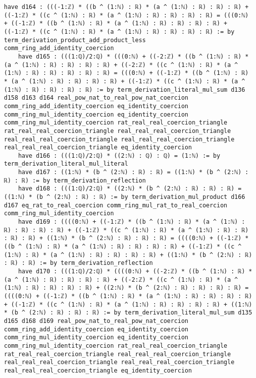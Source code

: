 \documentclass{article}
\begin{document}
\begin{tcolorbox}[colback=white!10, width=\linewidth]
\begin{lstlisting}[language=Lean4]
    have d164 : (((-1:ℤ) * ((b ^ (1:ℕ) : ℝ) * (a ^ (1:ℕ) : ℝ) : ℝ) : ℝ) + ((-1:ℤ) * ((c ^ (1:ℕ) : ℝ) * (a ^ (1:ℕ) : ℝ) : ℝ) : ℝ) : ℝ) = (((0:ℕ) + ((-1:ℤ) * ((b ^ (1:ℕ) : ℝ) * (a ^ (1:ℕ) : ℝ) : ℝ) : ℝ) : ℝ) + ((-1:ℤ) * ((c ^ (1:ℕ) : ℝ) * (a ^ (1:ℕ) : ℝ) : ℝ) : ℝ) : ℝ) := by term_derivation_product_add_product_less comm_ring_add_identity_coercion
    have d165 : (((1:ℚ)/2:ℚ) * (((0:ℕ) + ((-2:ℤ) * ((b ^ (1:ℕ) : ℝ) * (a ^ (1:ℕ) : ℝ) : ℝ) : ℝ) : ℝ) + ((-2:ℤ) * ((c ^ (1:ℕ) : ℝ) * (a ^ (1:ℕ) : ℝ) : ℝ) : ℝ) : ℝ) : ℝ) = (((0:ℕ) + ((-1:ℤ) * ((b ^ (1:ℕ) : ℝ) * (a ^ (1:ℕ) : ℝ) : ℝ) : ℝ) : ℝ) + ((-1:ℤ) * ((c ^ (1:ℕ) : ℝ) * (a ^ (1:ℕ) : ℝ) : ℝ) : ℝ) : ℝ) := by term_derivation_literal_mul_sum d136 d158 d163 d164 real_pow_nat_to_real_pow_nat_coercion comm_ring_add_identity_coercion eq_identity_coercion comm_ring_mul_identity_coercion eq_identity_coercion comm_ring_mul_identity_coercion rat_real_real_coercion_triangle rat_real_real_coercion_triangle real_real_real_coercion_triangle real_real_real_coercion_triangle real_real_real_coercion_triangle real_real_real_coercion_triangle eq_identity_coercion
    have d166 : (((1:ℚ)/2:ℚ) * ((2:ℕ) : ℚ) : ℚ) = (1:ℕ) := by term_derivation_literal_mul_literal
    have d167 : ((1:ℕ) * (b ^ (2:ℕ) : ℝ) : ℝ) = ((1:ℕ) * (b ^ (2:ℕ) : ℝ) : ℝ) := by term_derivation_reflection
    have d168 : (((1:ℚ)/2:ℚ) * ((2:ℕ) * (b ^ (2:ℕ) : ℝ) : ℝ) : ℝ) = ((1:ℕ) * (b ^ (2:ℕ) : ℝ) : ℝ) := by term_derivation_mul_product d166 d167 eq_rat_to_real_coercion comm_ring_mul_rat_to_real_coercion comm_ring_mul_identity_coercion
    have d169 : ((((0:ℕ) + ((-1:ℤ) * ((b ^ (1:ℕ) : ℝ) * (a ^ (1:ℕ) : ℝ) : ℝ) : ℝ) : ℝ) + ((-1:ℤ) * ((c ^ (1:ℕ) : ℝ) * (a ^ (1:ℕ) : ℝ) : ℝ) : ℝ) : ℝ) + ((1:ℕ) * (b ^ (2:ℕ) : ℝ) : ℝ) : ℝ) = ((((0:ℕ) + ((-1:ℤ) * ((b ^ (1:ℕ) : ℝ) * (a ^ (1:ℕ) : ℝ) : ℝ) : ℝ) : ℝ) + ((-1:ℤ) * ((c ^ (1:ℕ) : ℝ) * (a ^ (1:ℕ) : ℝ) : ℝ) : ℝ) : ℝ) + ((1:ℕ) * (b ^ (2:ℕ) : ℝ) : ℝ) : ℝ) := by term_derivation_reflection
    have d170 : (((1:ℚ)/2:ℚ) * ((((0:ℕ) + ((-2:ℤ) * ((b ^ (1:ℕ) : ℝ) * (a ^ (1:ℕ) : ℝ) : ℝ) : ℝ) : ℝ) + ((-2:ℤ) * ((c ^ (1:ℕ) : ℝ) * (a ^ (1:ℕ) : ℝ) : ℝ) : ℝ) : ℝ) + ((2:ℕ) * (b ^ (2:ℕ) : ℝ) : ℝ) : ℝ) : ℝ) = ((((0:ℕ) + ((-1:ℤ) * ((b ^ (1:ℕ) : ℝ) * (a ^ (1:ℕ) : ℝ) : ℝ) : ℝ) : ℝ) + ((-1:ℤ) * ((c ^ (1:ℕ) : ℝ) * (a ^ (1:ℕ) : ℝ) : ℝ) : ℝ) : ℝ) + ((1:ℕ) * (b ^ (2:ℕ) : ℝ) : ℝ) : ℝ) := by term_derivation_literal_mul_sum d135 d165 d168 d169 real_pow_nat_to_real_pow_nat_coercion comm_ring_add_identity_coercion eq_identity_coercion comm_ring_mul_identity_coercion eq_identity_coercion comm_ring_mul_identity_coercion rat_real_real_coercion_triangle rat_real_real_coercion_triangle real_real_real_coercion_triangle real_real_real_coercion_triangle real_real_real_coercion_triangle real_real_real_coercion_triangle eq_identity_coercion

\end{lstlisting}
\end{tcolorbox}
\end{document}
